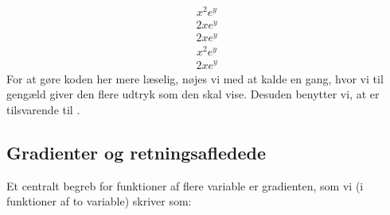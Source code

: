 \documentclass[letterpaper,10pt,english]{jupyterBook}
\begin{document}
\begin{sphinxVerbatim}[commandchars=\\\{\}]
  
                  
         
         
\end{sphinxVerbatim}
\begin{equation*}
\begin{split}\displaystyle x^{2} e^{y}\end{split}
\end{equation*}\begin{equation*}
\begin{split}\displaystyle 2 x e^{y}\end{split}
\end{equation*}\begin{equation*}
\begin{split}\displaystyle 2 x e^{y}\end{split}
\end{equation*}\begin{equation*}
\begin{split}\displaystyle x^{2} e^{y}\end{split}
\end{equation*}\begin{equation*}
\begin{split}\displaystyle 2 x e^{y}\end{split}
\end{equation*}
 For at gøre koden her mere læselig, nøjes vi med at kalde  en gang, hvor vi til gengæld giver den flere udtryk som den skal vise. Desuden benytter vi, at  er tilsvarende til .


\subsection{Gradienter og retningsafledede}
\label{\detokenize{notebooks/sympy/Notebook_FlereVar_analyse:gradienter-og-retningsafledede}}
Et centralt begreb for funktioner af flere variable er gradienten, som vi (i funktioner af to variable) skriver som:
\end{document}
